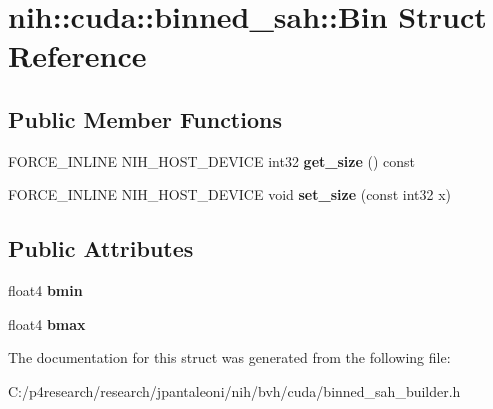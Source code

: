 \hypertarget{structnih_1_1cuda_1_1binned__sah_1_1_bin}{
\section{nih\-:\-:cuda\-:\-:binned\-\_\-sah\-:\-:\-Bin \-Struct \-Reference}
\label{structnih_1_1cuda_1_1binned__sah_1_1_bin}
}
\subsection*{\-Public \-Member \-Functions}
\begin{DoxyCompactItemize}
\item 
\hypertarget{structnih_1_1cuda_1_1binned__sah_1_1_bin_a8d7dae4c8e2809b98739023176633f15}{
\-F\-O\-R\-C\-E\-\_\-\-I\-N\-L\-I\-N\-E \-N\-I\-H\-\_\-\-H\-O\-S\-T\-\_\-\-D\-E\-V\-I\-C\-E int32 {\bfseries get\-\_\-size} () const }
\label{structnih_1_1cuda_1_1binned__sah_1_1_bin_a8d7dae4c8e2809b98739023176633f15}

\item 
\hypertarget{structnih_1_1cuda_1_1binned__sah_1_1_bin_a698ed11fa1cd7baef783268aa8a793dc}{
\-F\-O\-R\-C\-E\-\_\-\-I\-N\-L\-I\-N\-E \-N\-I\-H\-\_\-\-H\-O\-S\-T\-\_\-\-D\-E\-V\-I\-C\-E void {\bfseries set\-\_\-size} (const int32 x)}
\label{structnih_1_1cuda_1_1binned__sah_1_1_bin_a698ed11fa1cd7baef783268aa8a793dc}

\end{DoxyCompactItemize}
\subsection*{\-Public \-Attributes}
\begin{DoxyCompactItemize}
\item 
\hypertarget{structnih_1_1cuda_1_1binned__sah_1_1_bin_acc1ce983f35d7f63080e024e0ce6ada2}{
float4 {\bfseries bmin}}
\label{structnih_1_1cuda_1_1binned__sah_1_1_bin_acc1ce983f35d7f63080e024e0ce6ada2}

\item 
\hypertarget{structnih_1_1cuda_1_1binned__sah_1_1_bin_a81e938dea222b0f3dc61dbe76d9fd770}{
float4 {\bfseries bmax}}
\label{structnih_1_1cuda_1_1binned__sah_1_1_bin_a81e938dea222b0f3dc61dbe76d9fd770}

\end{DoxyCompactItemize}


\-The documentation for this struct was generated from the following file\-:\begin{DoxyCompactItemize}
\item 
\-C\-:/p4research/research/jpantaleoni/nih/bvh/cuda/binned\-\_\-sah\-\_\-builder.\-h\end{DoxyCompactItemize}
